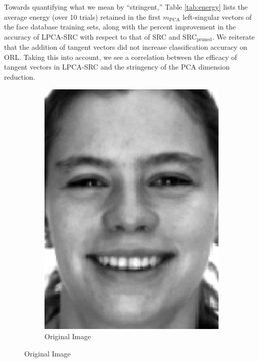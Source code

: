 \documentclass[review]{elsarticle}
\begin{document}
Towards quantifying what we mean by ``stringent,'' Table \ref{tab:energy} lists the average energy (over 10 trials) retained in the first $m_\mathrm{PCA}$ left-singular vectors of the face database training sets, along with the percent improvement in the accuracy of LPCA-SRC with respect to that of SRC and SRC$_\mathrm{pruned}$. We reiterate that the addition of tangent vectors did not increase classification accuracy on ORL. Taking this into account, we see a correlation between the efficacy of tangent vectors in LPCA-SRC and the stringency of the PCA dimension reduction. 


\begin{figure}[H]
 \hspace*{\fill}
\centering
\begin{subfigure}[b]{0.18\textwidth}
\centering
	\includegraphics[width=\linewidth]{Fig_4a}
		\caption{Original Image}
	\label{fig:orig_image_ex_2} \hfill
\end{subfigure}

\end{figure}
\end{document}
